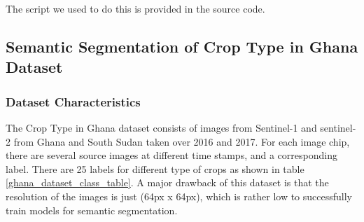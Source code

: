 \documentclass[conference]{IEEEtran}
\begin{document}
The script we used to do this is provided in the source code.


\subsection{Semantic Segmentation of Crop Type in Ghana Dataset}
\subsubsection{Dataset Characteristics}
The Crop Type in Ghana dataset \cite{Rustowicz2019SemanticSO} consists of images from Sentinel-1 and sentinel-2 from Ghana and South Sudan taken over 2016 and 2017. For each image chip, there are several source images at different time stamps, and a corresponding label. There are 25 labels for different type of crops as shown in table \ref{ghana_dataset_class_table}. A major drawback of this dataset is that the resolution of the images is just (64px x 64px), which is rather low to successfully train models for semantic segmentation. 
\end{document}
